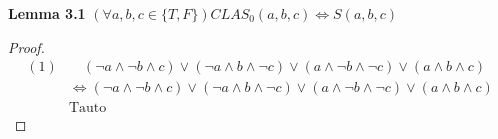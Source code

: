 \documentclass{article}
\begin{document}
\newpage

\noindent \textbf{Lemma 3.1}  $ (\forall a, b, c \in \{T, F\}) CLAS_0(a, b, c) \iff S(a, b, c)  $ 
\begin{proof}
	\begin{align*}
		(1) & \quad  (\lnot a \land \lnot b \land c) \lor (\lnot a \land b \land \lnot c) \lor (a \land \lnot b \land \lnot c) \lor (a \land b \land c) \\
		& \iff (\lnot a \land \lnot b \land c) \lor (\lnot a \land b \land \lnot c) \lor (a \land \lnot b \land \lnot c) \lor (a \land b \land c) \\
		& \text{Tauto}
	\end{align*}
\end{proof}
\end{document}

